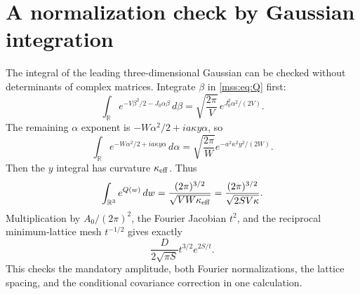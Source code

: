 \documentclass[11pt,letterpaper]{article}
\numberwithin{equation}{section}
\theoremstyle{definition}\newtheorem{definition}[theorem]{Definition}
\theoremstyle{remark}\newtheorem{remark}[theorem]{Remark}
\newcommand{\R}{\mathbb R}
\begin{document}
\section{A normalization check by Gaussian integration}\label{mss:app:gaussian}
The integral of the leading three-dimensional Gaussian can be checked without determinants of complex matrices. Integrate $\beta$ in \eqref{mss:eq:Q} first:
\[
\int_\R e^{-V\beta^2/2-J_0\alpha\beta}\,d\beta
=\sqrt{\frac{2\pi}{V}}\,
 e^{J_0^2\alpha^2/(2V)}.
\]
The remaining $\alpha$ exponent is $-W\alpha^2/2+ia\kappa y\alpha$, so
\[
\int_\R e^{-W\alpha^2/2+ia\kappa y\alpha}\,d\alpha
=\sqrt{\frac{2\pi}{W}}
 e^{-a^2\kappa^2y^2/(2W)}.
\]
Then the $y$ integral has curvature $\kappa_{\rm eff}$. Thus
\begin{equation}\label{mss:eq:GaussianIntegral}
\int_{\R^3}e^{Q(w)}\,dw
=\frac{(2\pi)^{3/2}}{\sqrt{VW\kappa_{\rm eff}}}
=\frac{(2\pi)^{3/2}}{\sqrt{2SV\kappa}}.
\end{equation}
Multiplication by $A_0/(2\pi)^2$, the Fourier Jacobian $t^2$, and the reciprocal minimum-lattice mesh $t^{-1/2}$ gives exactly
\[
\frac{D}{2\sqrt{\pi S}}t^{3/2}e^{2S/t}.
\]
This checks the mandatory amplitude, both Fourier normalizations, the lattice spacing, and the conditional covariance correction in one calculation.
\end{document}
